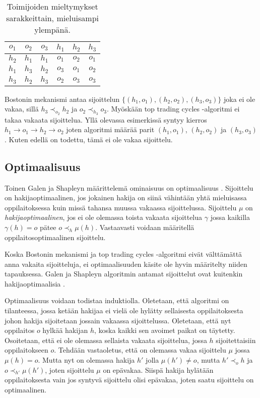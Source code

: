 \documentclass[twoside]{tktltiki}
\begin{document}
\begin{table}[ht]
  \begin{center}
    \begin{tabular}{ c c c | c c c }
    $o_1$ & $o_2$ & $o_3$ & $h_1$ & $h_2$ & $h_3$ \\
    \hline
    $h_2$ & $h_1$ & $h_1$ & $o_1$ & $o_2$ & $o_1$ \\
    $h_1$ & $h_3$ & $h_2$ & $o_3$ & $o_1$ & $o_2$ \\
    $h_3$ & $h_2$ & $h_3$ & $o_2$ & $o_3$ & $o_3$
    \end{tabular}
    \caption{Toimijoiden mieltymykset sarakkeittain, mieluisampi ylempänä.}
    \label{boston_vakaus}
  \end{center}
\end{table}

Bostonin mekanismi antaa sijoittelun $\{(h_1, o_1), (h_2, o_2), (h_3,
o_3)\}$ joka ei ole vakaa, sillä $h_3 \prec_{o_2} h_2$ ja $o_2
\prec_{h_3} o_3$. Myöskään top trading cycles -algoritmi ei takaa
vakaata sijoittelua. Yllä olevassa esimerkissä syntyy kierros $h_1
\rightarrow o_1 \rightarrow h_2 \rightarrow o_2$ joten algoritmi
määrää parit $(h_1, o_1)$, $(h_2, o_2)$ ja $(h_3, o_3)$. Kuten edellä
on todettu, tämä ei ole vakaa sijoittelu.

\subsection{Optimaalisuus}

Toinen Galen ja Shapleyn määrittelemä ominaisuus on optimaalisuus
\cite{galeshapley62}. Sijoittelu on hakijaoptimaalinen, jos jokainen
hakija on siinä vähintään yhtä mieluisassa oppilaitoksessa kuin missä
tahansa muussa vakaassa sijoittelussa. Sijoittelu $\mu$ on
\emph{hakijaoptimaalinen}, jos ei ole olemassa toista vakaata
sijoittelua $\gamma$ jossa kaikilla $\gamma(h) = o$ pätee $o \prec_h
\mu(h)$. Vastaavasti voidaan määritellä oppilaitosoptimaalinen
sijoittelu.

Koska Bostonin mekanismi ja top trading cycles -algoritmi eivät
välttämättä anna vakaita sijoitteluja, ei optimaalisuuden käsite ole
hyvin määritelty niiden tapauksessa. Galen ja Shapleyn algoritmin
antamat sijoittelut ovat kuitenkin hakijaoptimaalisia
\cite{galeshapley62}.

Optimaalisuus voidaan todistaa induktiolla. Oletetaan, että algoritmi
on tilanteessa, jossa ketään hakijaa ei vielä ole hylätty sellaisesta
oppilaitoksesta johon hakija sijoitetaan jossain vakaassa
sijoittelussa. Oletetaan, että nyt oppilaitos $o$ hylkää hakijan $h$,
koska kaikki sen avoimet paikat on täytetty. Osoitetaan, että ei ole
olemassa sellaista vakaata sijoittelua, jossa $h$ sijoitettaisiin
oppilaitokseen $o$. Tehdään vastaoletus, että on olemassa vakaa
sijoittelu $\mu$ jossa $\mu(h) = o$. Mutta nyt on olemassa hakija $h'$
jolla $\mu(h') \neq o$, mutta $h' \prec_o h$ ja $o \prec_{h'}
\mu(h')$, joten sijoittelu $\mu$ on epävakaa. Siispä hakija hylätään
oppilaitoksesta vain jos syntyvä sijoittelu olisi epävakaa, joten
saatu sijoittelu on optimaalinen.
\end{document}
